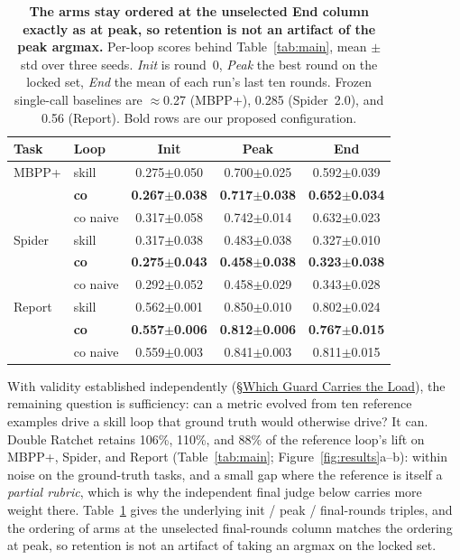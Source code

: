 \documentclass[letterpaper]{article} %
\begin{document}
\begin{table}[t]
\centering
\footnotesize
\setlength{\tabcolsep}{3pt}
\begin{tabular}{llccc}
\toprule
Task & Loop & Init & Peak & End \\
\midrule
MBPP+ & skill & 0.275$\pm$0.050 & 0.700$\pm$0.025 & 0.592$\pm$0.039 \\
 & \textbf{co} & \textbf{0.267$\pm$0.038} & \textbf{0.717$\pm$0.038} & \textbf{0.652$\pm$0.034} \\
 & co naive & 0.317$\pm$0.058 & 0.742$\pm$0.014 & 0.632$\pm$0.023 \\
\midrule
Spider & skill & 0.317$\pm$0.038 & 0.483$\pm$0.038 & 0.327$\pm$0.010 \\
 & \textbf{co} & \textbf{0.275$\pm$0.043} & \textbf{0.458$\pm$0.038} & \textbf{0.323$\pm$0.038} \\
 & co naive & 0.292$\pm$0.052 & 0.458$\pm$0.029 & 0.343$\pm$0.028 \\
\midrule
Report & skill & 0.562$\pm$0.001 & 0.850$\pm$0.010 & 0.802$\pm$0.024 \\
 & \textbf{co} & \textbf{0.557$\pm$0.006} & \textbf{0.812$\pm$0.006} & \textbf{0.767$\pm$0.015} \\
 & co naive & 0.559$\pm$0.003 & 0.841$\pm$0.003 & 0.811$\pm$0.015 \\
\bottomrule
\end{tabular}
\caption{\textbf{The arms stay ordered at the unselected End column exactly as at peak, so retention is not an artifact of the peak argmax.} Per-loop scores behind Table~\ref{tab:main}, mean $\pm$ std over three seeds. \emph{Init} is round~0, \emph{Peak} the best round on the locked set, \emph{End} the mean of each run's last ten rounds. Frozen single-call baselines are $\approx$0.27 (MBPP+), 0.285 (Spider~2.0), and 0.56 (Report). Bold rows are our proposed configuration.}
\label{tab:perloop}
\end{table}

With validity established independently (\S\hyperref[sec:ablation]{Which Guard Carries the Load}), the remaining question is sufficiency: can a metric evolved from ten reference examples drive a skill loop that ground truth would otherwise drive? It can. Double Ratchet retains 106\%, 110\%, and 88\% of the reference loop's lift on MBPP+, Spider, and Report (Table~\ref{tab:main}; Figure~\ref{fig:results}a--b): within noise on the ground-truth tasks, and a small gap where the reference is itself a \emph{partial rubric}, which is why the independent final judge below carries more weight there. Table~\ref{tab:perloop} gives the underlying init / peak / final-rounds triples, and the ordering of arms at the unselected final-rounds column matches the ordering at peak, so retention is not an artifact of taking an argmax on the locked set.
\end{document}
